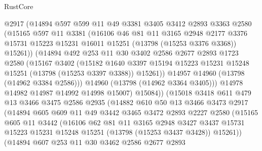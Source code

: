 \begin{lexlean}{RustCore}
\begin{coremodule}
            @2917
            (@14894
              @597
              @599
              @11
              @49
              @3381
              @3405
              @3412
              @2893
              @3363
              @2580
              (@15165
                @597
                @11
                @3381
                (@16106
                  @46
                  @81
                  @11
                  @3165
                  @2948
                  @2177
                  @3376
                  @15731
                  @15223
                  @15231
                  @16011
                  @15251
                  (@13798 (@15253 @3376 @3368))
                  @15261))
              (@14894
                @492
                @253
                @11
                @30
                @3402
                @2586
                @2677
                @2893
                @1723
                @2580
                (@15167
                  @3402
                  (@15182
                    @1640
                    @3397
                    @15194
                    @15223
                    @15231
                    @15248
                    @15251
                    (@13798 (@15253 @3397 @3388))
                    @15261))
                @14957
                @14960
                (@13798 (@14962 @3384 @2586)))
              @14960
              (@13798 (@14962 @3364 @3405)))
            @14978
            @14982
            @14987
            @14992
            @14998
            @15007)
          @15084))
      (@15018
        @3418
        @611
        @479
        @13
        @3466
        @3475
        @2586
        @2935
        (@14882
          @610
          @50
          @13
          @3466
          @3473
          @2917
          (@14894
            @605
            @609
            @11
            @49
            @3442
            @3465
            @3472
            @2893
            @2227
            @2580
            (@15165
              @605
              @11
              @3442
              (@16106
                @62
                @81
                @11
                @3165
                @2948
                @3427
                @3437
                @15731
                @15223
                @15231
                @15248
                @15251
                (@13798 (@15253 @3437 @3428))
                @15261))
            (@14894
              @607
              @253
              @11
              @30
              @3462
              @2586
              @2677
              @2893

\end{coremodule}
\end{lexlean}
